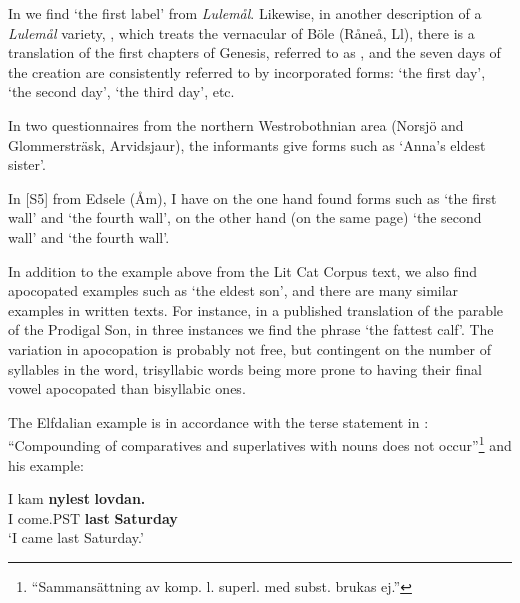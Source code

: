 In \citet[61]{Nordström1925} we find  ‘the first label’ from \textit{Lulemål}. Likewise, in another description of a \textit{Lulemål} variety, \citet{Wikberg2004}, which treats the vernacular of Böle (Råneå, Ll), there is a translation of the first chapters of Genesis, referred to as , and the seven days of the creation are consistently referred to by incorporated forms:  ‘the first day’,  ‘the second day’,  ‘the third day’, etc. 

In two questionnaires from the northern Westrobothnian area (Norsjö and Glommersträsk, Arvidsjaur), the informants give forms such as  ‘Anna’s eldest sister’.

In [S5] from Edsele (Åm), I have on the one hand found forms such as  ‘the first wall’ and ‘the fourth wall’, on the other hand (on the same page)  ‘the second wall’ and ‘the fourth wall’.

In addition to the example above from the Lit Cat Corpus text, we also find apocopated examples such as  ‘the eldest son’, and there are many similar examples in written texts. For instance, in a published translation of the parable of the Prodigal Son, in three instances we find the phrase  ‘the fattest calf’. The variation in apocopation is probably not free, but contingent on the number of syllables in the word, trisyllabic words being more prone to having their final vowel apocopated than bisyllabic ones. 

The Elfdalian example is in accordance with the terse statement in \citet[57]{Levander1909}: “Compounding of comparatives and superlatives with nouns does not occur”\footnote{ “Sammansättning av komp. l. superl. med subst. brukas ej.”} and his example:

\ea\label{}
\gll I  kam  \textbf{nylest} \textbf{lovdan.}\\
I  come.PST  \textbf{last} \textbf{Saturday}\\
\glt ‘I came last Saturday.’
\z

